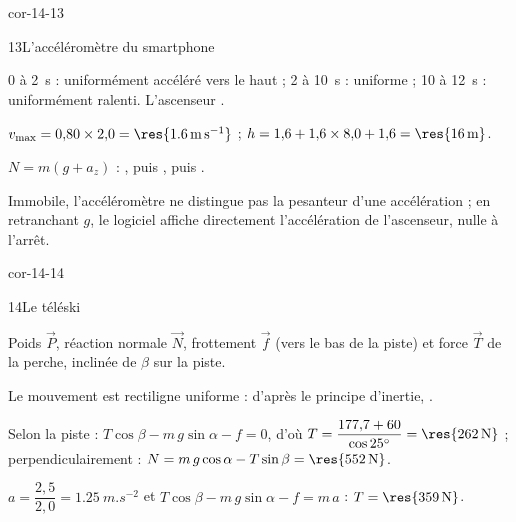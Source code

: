 \begin{blocLivre}{cor-14-13}
\begin{corrige}{13}{L'accéléromètre du smartphone}
\begin{questions}
\item 0 à 2~s : uniformément accéléré vers le haut ; 2 à 10~s : uniforme ; 10 à 12~s : uniformément ralenti.
L'ascenseur .
\item $v_{\max}=0{,}80\times2{,}0=\res{\qty{1,6}{m.s^{-1}}}$ ; $h=1{,}6+1{,}6\times8{,}0+1{,}6=\res{\qty{16}{m}}$.
\item $N=m(g+a_z)$ : , puis , puis .
\item Immobile, l'accéléromètre ne distingue pas la pesanteur d'une accélération ; en retranchant $g$, le logiciel affiche
directement l'accélération de l'ascenseur, nulle à l'arrêt.
\end{questions}
\end{corrige}
\end{blocLivre}
\begin{blocLivre}{cor-14-14}
\begin{corrige}{14}{Le téléski}
\begin{questions}
\item Poids $\vec{P}$, réaction normale $\vec{N}$, frottement $\vec{f}$ (vers le bas de la piste) et force $\vec{T}$ de
la perche, inclinée de $\beta$ sur la piste.
\item Le mouvement est rectiligne uniforme : d'après le principe d'inertie, .
\item Selon la piste : $T\cos\beta-m\,g\sin\alpha-f=0$, d'où $T=\dfrac{177{,}7+60}{\cos25^\circ}=\res{\qty{262}{N}}$ ;
perpendiculairement : $N=m\,g\cos\alpha-T\sin\beta=\res{\qty{552}{N}}$.
\item $a=\dfrac{2{,}5}{2{,}0}=\qty{1,25}{m.s^{-2}}$ et $T\cos\beta-m\,g\sin\alpha-f=m\,a$ : $T=\res{\qty{359}{N}}$.
\end{questions}
\end{corrige}
\end{blocLivre}
